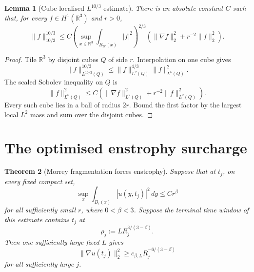 \documentclass[11pt]{article}
\newtheorem{theorem}{Theorem}
\newtheorem{lemma}[theorem]{Lemma}
\theoremstyle{remark}
\newcommand{\R}{\mathbb R}
\begin{document}
\begin{lemma}[Cube-localised \(L^{10/3}\) estimate]
\label{lem:local-10/3}
There is an absolute constant \(C\) such that, for every
\(f\in H^1(\R^3)\) and \(r>0\),
\begin{equation}
 \label{eq:local-10/3}
 \|f\|_{10/3}^{10/3}
 \le
 C\left(
 \sup_{x\in\R^3}\int_{B_{2r}(x)}|f|^2
 \right)^{2/3}
 \left(
 \|\nabla f\|_2^2+r^{-2}\|f\|_2^2
 \right).
\end{equation}
\end{lemma}

\begin{proof}
Tile \(\R^3\) by disjoint cubes \(Q\) of side \(r\).  Interpolation on one
cube gives
\[
 \|f\|_{L^{10/3}(Q)}^{10/3}
 \le
 \|f\|_{L^2(Q)}^{4/3}
 \|f\|_{L^6(Q)}^2.
\]
The scaled Sobolev inequality on \(Q\) is
\[
 \|f\|_{L^6(Q)}^2
 \le
 C\left(
 \|\nabla f\|_{L^2(Q)}^2
 +r^{-2}\|f\|_{L^2(Q)}^2
 \right).
\]
Every such cube lies in a ball of radius \(2r\).  Bound the first factor
by the largest local \(L^2\) mass and sum over the disjoint cubes.
\end{proof}

\section{The optimised enstrophy surcharge}

\begin{theorem}[Morrey fragmentation forces enstrophy]
\label{thm:enstrophy}
Suppose that at \(t_j\), on every fixed compact set,
\begin{equation}
 \label{eq:beta-morrey}
 \sup_x\int_{B_r(x)}|u(y,t_j)|^2\,dy
 \le C r^\beta
\end{equation}
for all sufficiently small \(r\), where \(0<\beta<3\).  Suppose the
terminal time window of this estimate contains \(t_j\) at
\begin{equation}
 \label{eq:rho-def}
 \rho_j:=L R_j^{3/(3-\beta)}.
\end{equation}
Then one sufficiently large fixed \(L\) gives
\begin{equation}
 \label{eq:enstrophy-beta}
 \boxed{
 \|\nabla u(t_j)\|_2^2
 \ge c_{\beta,L}R_j^{-6/(3-\beta)}
 }
\end{equation}
for all sufficiently large \(j\).
\end{theorem}
\end{document}
